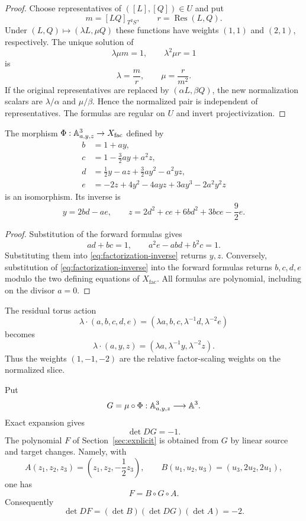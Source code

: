 \begin{proof}
Choose representatives of $([L],[Q])\in U$ and put
\[
 m=[LQ]_{T^2S},\qquad r=\operatorname{Res}(L,Q).
\]
Under $(L,Q)\mapsto(\lambda L,\mu Q)$ these functions have weights $(1,1)$
and $(2,1)$, respectively.  The unique solution of
\[
 \lambda\mu m=1,
 \qquad
 \lambda^2\mu r=1
\]
is
\[
 \lambda=\frac mr,
 \qquad
 \mu=\frac r{m^2}.
\]
If the original representatives are replaced by $(\alpha L,\beta Q)$, the
new normalization scalars are $\lambda/\alpha$ and $\mu/\beta$.  Hence the
normalized pair is independent of representatives.  The formulas are regular
on $U$ and invert projectivization.
\end{proof}

\begin{proposition}\label{prop:factorization-slice}
The morphism $\Phi:\mathbb A^3_{a,y,z}\to X_{\mathrm{fac}}$ defined by
\begin{align*}
 b&=1+ay,\\
 c&=1-\frac32ay+a^2z,\\
 d&=\frac12y-az+\frac32ay^2-a^2yz,\\
 e&=-2z+4y^2-4ayz+3ay^3-2a^2y^2z
\end{align*}
is an isomorphism.  Its inverse is
\begin{equation}\label{eq:factorization-inverse}
 y=2bd-ae,
 \qquad
 z=2d^2+ce+6bd^2+3bce-\frac92e.
\end{equation}
\end{proposition}

\begin{proof}
Substitution of the forward formulas gives
\[
 ad+bc=1,
 \qquad
 a^2e-abd+b^2c=1.
\]
Substituting them into \eqref{eq:factorization-inverse} returns $y,z$.
Conversely, substitution of \eqref{eq:factorization-inverse} into the forward
formulas returns $b,c,d,e$ modulo the two defining equations of
$X_{\mathrm{fac}}$.  All formulas are polynomial, including on the divisor
$a=0$.
\end{proof}

The residual torus action
\[
 \lambda\cdot(a,b,c,d,e)
 =(\lambda a,b,c,\lambda^{-1}d,\lambda^{-2}e)
\]
becomes
\[
 \lambda\cdot(a,y,z)=(\lambda a,\lambda^{-1}y,\lambda^{-2}z).
\]
Thus the weights $(1,-1,-2)$ are the relative factor-scaling weights on the
normalized slice.

Put
\[
 G=\mu\circ\Phi:\mathbb A^3_{a,y,z}\longrightarrow\mathbb A^3.
\]
Exact expansion gives
\[
 \det DG=-1.
\]
The polynomial $F$ of Section~\ref{sec:explicit} is obtained from $G$ by
linear source and target changes.  Namely, with
\[
 A(z_1,z_2,z_3)=\left(z_1,z_2,-\frac12z_3\right),
 \qquad
 B(u_1,u_2,u_3)=(u_3,2u_2,2u_1),
\]
one has
\begin{equation}\label{eq:factorization-to-foundational}
 F=B\circ G\circ A.
\end{equation}
Consequently
\[
 \det DF=(\det B)(\det DG)(\det A)=-2.
\]

